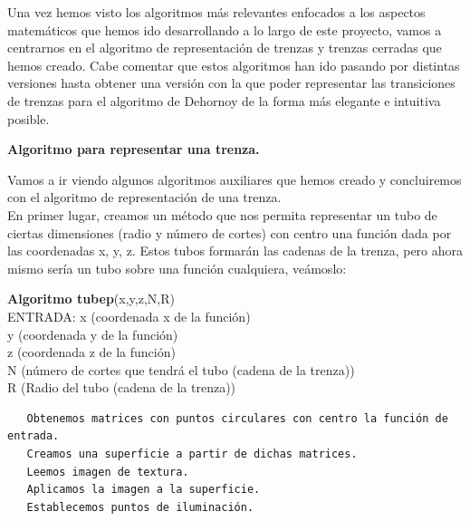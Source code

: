 \newpage

Una vez hemos visto los algoritmos más relevantes enfocados a los aspectos matemáticos que hemos ido desarrollando a lo largo de este proyecto, vamos a centrarnos en el algoritmo de representación de trenzas y trenzas cerradas que hemos creado. Cabe comentar que estos algoritmos han ido pasando por distintas versiones hasta obtener una versión con la que poder representar las transiciones de trenzas para el algoritmo de Dehornoy de la forma más elegante e intuitiva posible. 

 \begin{center}
 	\textbf{Algoritmo para representar una trenza.}
 \end{center} 
 Vamos a ir viendo algunos algoritmos auxiliares que hemos creado y concluiremos con el algoritmo de representación de una trenza. \\
 En primer lugar, creamos un método que nos permita representar un tubo de ciertas dimensiones (radio y número de cortes) con centro una función dada por las coordenadas x, y, z. Estos tubos formarán las cadenas de la trenza, pero ahora mismo sería un tubo sobre una función cualquiera, veámoslo:
 
 \begin{alg}
 	\textbf{Algoritmo tubep}(x,y,z,N,R)\\
 	ENTRADA: x (coordenada x de la función)\\
 	\hspace*{2.2cm} y (coordenada y de la función)\\
 	\hspace*{2.2cm} z (coordenada z de la función)\\
 	\hspace*{2.2cm} N (número de cortes que tendrá el tubo (cadena de la trenza))\\
 	\hspace*{2.2cm} R (Radio del tubo (cadena de la trenza))
 	
\begin{lstlisting}
   Obtenemos matrices con puntos circulares con centro la función de entrada.
   Creamos una superficie a partir de dichas matrices.
   Leemos imagen de textura.
   Aplicamos la imagen a la superficie.
   Establecemos puntos de iluminación.
   
\end{lstlisting}
 \end{alg}
 
